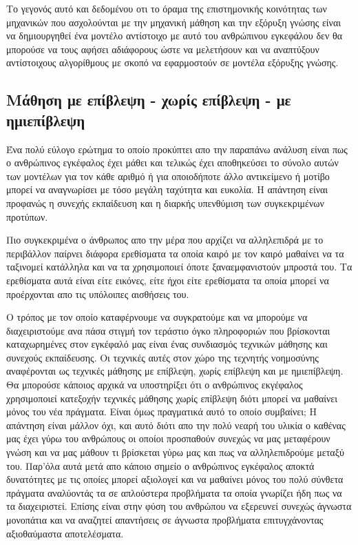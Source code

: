 \par Το γεγονός αυτό και δεδομένου οτι το όραμα της επιστημονικής κοινότητας των μηχανικών που ασχολούνται με την μηχανική μάθηση και την εξόρυξη γνώσης είναι να δημιουργηθεί ένα μοντέλο αντίστοιχο με αυτό του ανθρώπινου εγκεφάλου δεν θα μπορούσε να τους αφήσει αδιάφορους ώστε να μελετήσουν και να αναπτύξουν αντίστοιχους αλγορίθμους με σκοπό να εφαρμοστούν σε μοντέλα εξόρυξης γνώσης.


\subsection{Μάθηση με επίβλεψη - χωρίς επίβλεψη - με ημιεπίβλεψη}
\par
Ένα πολύ εύλογο ερώτημα το οποίο προκύπτει απο την παραπάνω ανάλυση είναι πως ο ανθρώπινος εγκέφαλος έχει μάθει και τελικώς έχει αποθηκεύσει το σύνολο αυτών των μοντέλων για τον κάθε αριθμό ή για οποιοδήποτε άλλο αντικείμενο ή μοτίβο μπορεί να αναγνωρίσει με τόσο μεγάλη ταχύτητα και ευκολία. Η απάντηση είναι προφανώς η συνεχής εκπαίδευση και η διαρκής υπενθύμιση των συγκεκριμένων προτύπων.
\par
Πιο συγκεκριμένα ο άνθρωπος απο την μέρα που αρχίζει να αλληλεπιδρά με το περιβάλλον παίρνει διάφορα ερεθίσματα τα οποία καιρό με τον καιρό μαθαίνει να τα ταξινομεί κατάλληλα και να τα χρησιμοποιεί όποτε ξαναεμφανιστούν μπροστά του. Τα ερεθίσματα αυτά είναι είτε εικόνες, είτε ήχοι είτε ερεθίσματα τα οποία μπορεί να προέρχονται απο τις υπόλοιπες αισθήσεις του.
\par
Ο τρόπος με τον οποίο καταφέρνουμε να συγκρατούμε και να μπορούμε να διαχειριστούμε ανα πάσα στιγμή τον τεράστιο όγκο πληροφοριών που βρίσκονται καταχωρημένες στον εγκέφαλό μας είναι ένας συνδιασμός τεχνικών μάθησης και συνεχούς εκπαίδευσης. Οι τεχνικές αυτές στον χώρο της τεχνητής νοημοσύνης αναφέρονται ως τεχνικές μάθησης με επίβλεψη, χωρίς επίβλεψη και με ημιεπίβλεψη. Θα μπορούσε κάποιος αρχικά να υποστηρίξει ότι ο ανθρώπινος εκγέφαλος χρησιμοποιεί κατεξοχήν τεχνικές μάθησης χωρίς επίβλεψη διότι μπορεί να μαθαίνει μόνος του νέα πράγματα. Είναι όμως πραγματικά αυτό το οποίο συμβαίνει; Η απάντηση είναι μάλλον όχι, και αυτό διότι απο την πολύ νεαρή του υλικία ο καθένας μας έχει γύρω του ανθρώπους οι οποίοι προσπαθούν συνεχώς να μας μεταφέρουν γνώση και να μας μάθουν τι βρίσκεται γύρω μας και πως να αλληλεπιδρούμε μεταξύ του. Παρ'όλα αυτά μετά απο κάποιο σημείο ο ανθρώπινος εγκέφαλος αποκτά δυνατότητες με τις οποίες μπορεί αξιολογεί και να μαθαίνει μόνος του πολύ σύνθετα πράγματα αναλύοντάς τα σε απλούστερα προβλήματα τα οποία γνωρίζει ήδη πως να τα διαχειριστεί. Επίσης είναι στην φύση του ανθρώπου να εξερευνεί συνεχώς άγνωστα μονοπάτια και να αναζητεί απαντήσεις σε άγνωστα προβλήματα επιτυγχάνοντας αξιοθαύμαστα αποτελέσματα.

